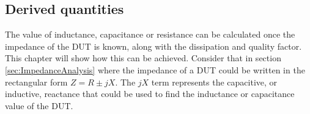 \subsection{Derived quantities} \label{subsec:DerivedQuantities}
The value of inductance, capacitance or resistance can be calculated once the impedance of the DUT is known, along with the dissipation and quality factor. This chapter will show how this can be achieved. Consider that in section \ref{sec:ImpedanceAnalysis} where the impedance of a DUT could be written in the rectangular form $Z = R \pm jX$. The $jX$ term represents the capacitive, or inductive, reactance that could be used to find the inductance or capacitance value of the DUT.